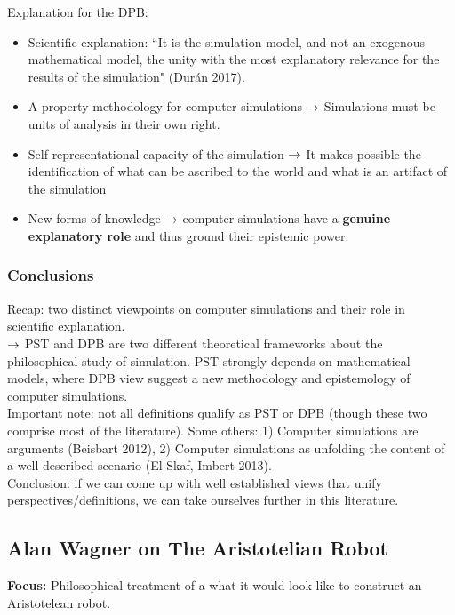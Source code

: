 Explanation for the DPB:
\begin{itemize}
	\item Scientific explanation: ``It is the simulation model, and not an exogenous mathematical model, the unity with the most explanatory relevance for the results of the simulation" (Dur{\' a}n 2017).
	\item A property methodology for computer simulations
	$\rightarrow$ Simulations must be units of analysis in their own right.
	\item Self representational capacity of the simulation
	$\rightarrow$ It makes possible the identification of what can be ascribed to the world and what is an artifact of the simulation
	\item New forms of knowledge
	$\rightarrow$ computer simulations have a {\bf genuine explanatory role} and thus ground their epistemic power.
\end{itemize}


\subsubsection{Conclusions}

Recap: two distinct viewpoints on computer simulations and their role in scientific explanation. \\

$\rightarrow$ PST and DPB are two different theoretical frameworks about the philosophical study of simulation. PST strongly depends on mathematical models, where DPB view suggest a new methodology and epistemology of computer simulations. \\


Important note: not all definitions qualify as PST or DPB (though these two comprise most of the literature). Some others: 1) Computer simulations are arguments (Beisbart 2012), 2) Computer simulations as unfolding the content of a well-described scenario (El Skaf, Imbert 2013). \\

Conclusion: if we can come up with well established views that unify perspectives/definitions, we can take ourselves further in this literature.

\spacerule

\subsection{Alan Wagner on The Aristotelian Robot}

{\bf Focus:} Philosophical treatment of a what it would look like to construct an Aristotelean robot. \\

